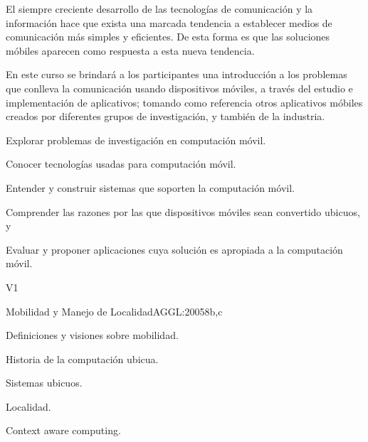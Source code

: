 \begin{syllabus}


\begin{justification}
El siempre creciente desarrollo de las tecnologías de comunicación y la
información hace que exista una marcada tendencia a  establecer medios de 
comunicación más simples y eficientes. De esta forma es que las soluciones
móbiles aparecen como respuesta a esta nueva tendencia.

En este curso se brindará a los participantes una introducción a los
problemas que conlleva la comunicación usando dispositivos móviles, a través del
estudio e implementación de aplicativos; tomando como referencia otros aplicativos
móbiles creados por diferentes grupos de investigación, y también de la industria.

\end{justification}

\begin{goals}
      \item Explorar problemas de investigación en computación móvil.
      \item Conocer tecnologías usadas para computación móvil.
      \item Entender y construir sistemas que soporten la computación móvil.
      \item Comprender las razones por las que dispositivos móviles sean convertido ubicuos, y
      \item Evaluar y proponer aplicaciones cuya solución es apropiada a la computación móvil.

\end{goals}

\begin{outcomes}{V1}
\end{outcomes}

\begin{unit}{Mobilidad y Manejo de Localidad}{AGGL:2005}{8}{b,c}
   \begin{topics}
     \item Definiciones y visiones sobre mobilidad.
     \item Historia de la computación ubicua.
     \item Sistemas ubicuos.
     \item Localidad.
     \item Context aware computing.
   \end{topics}


\end{unit}
\end{syllabus}
